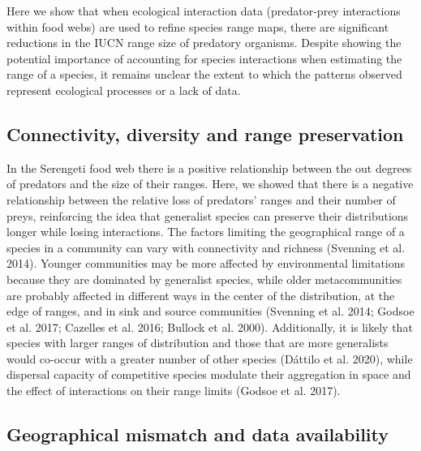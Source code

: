 \documentclass[10pt,oneside]{article}
\begin{document}
Here we show that when ecological interaction data (predator-prey
interactions within food webs) are used to refine species range maps,
there are significant reductions in the IUCN range size of predatory
organisms. Despite showing the potential importance of accounting for
species interactions when estimating the range of a species, it remains
unclear the extent to which the patterns observed represent ecological
processes or a lack of data.

\hypertarget{connectivity-diversity-and-range-preservation}{%
\subsection{Connectivity, diversity and range
preservation}\label{connectivity-diversity-and-range-preservation}}

In the Serengeti food web there is a positive relationship between the
out degrees of predators and the size of their ranges. Here, we showed
that there is a negative relationship between the relative loss of
predators' ranges and their number of preys, reinforcing the idea that
generalist species can preserve their distributions longer while losing
interactions. The factors limiting the geographical range of a species
in a community can vary with connectivity and richness (Svenning et al.
2014). Younger communities may be more affected by environmental
limitations because they are dominated by generalist species, while
older metacommunities are probably affected in different ways in the
center of the distribution, at the edge of ranges, and in sink and
source communities (Svenning et al. 2014; Godsoe et al. 2017; Cazelles
et al. 2016; Bullock et al. 2000). Additionally, it is likely that
species with larger ranges of distribution and those that are more
generalists would co-occur with a greater number of other species
(Dáttilo et al. 2020), while dispersal capacity of competitive species
modulate their aggregation in space and the effect of interactions on
their range limits (Godsoe et al. 2017).

\hypertarget{geographical-mismatch-and-data-availability}{%
\subsection{Geographical mismatch and data
availability}\label{geographical-mismatch-and-data-availability}}
\end{document}
